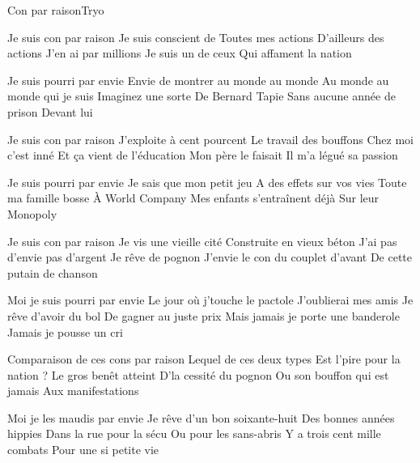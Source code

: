 \begin{Song}{Con par raison}{Tryo}
\begin{multicols}{2}
\begin{Verse}
Je suis con par raison
Je suis conscient de
Toutes mes actions
D'ailleurs des actions
J'en ai par millions
Je suis un de ceux
Qui affament la nation
\end{Verse}
\espaceInterStrophe

\begin{Chorus}
Je suis pourri par envie
Envie de montrer au monde au monde
Au monde au monde qui je suis
Imaginez une sorte
De Bernard Tapie
Sans aucune année de prison
Devant lui
\end{Chorus}
\espaceInterStrophe

\begin{Verse}
Je suis con par raison
J'exploite à cent pourcent
Le travail des bouffons
Chez moi c'est inné
Et ça vient de l'éducation
Mon père le faisait
Il m'a légué sa passion
\end{Verse}
\espaceInterStrophe

\begin{Chorus}
Je suis pourri par envie
Je sais que mon petit jeu
A des effets sur vos vies
Toute ma famille bosse
\`A World Company
Mes enfants s'entraînent déjà
Sur leur Monopoly
\end{Chorus}
\vfill
\columnbreak

\begin{Verse}
Je suis con par raison
Je vis une vieille cité
Construite en vieux béton
J'ai pas d'envie pas d'argent
Je rêve de pognon
J'envie le con du couplet d'avant
De cette putain de chanson
\end{Verse}
\espaceInterStrophe

\begin{Chorus}
Moi je suis pourri par envie
Le jour où j'touche le pactole
J'oublierai mes amis
Je rêve d'avoir du bol
De gagner au juste prix
Mais jamais je porte une banderole
Jamais je pousse un cri
\end{Chorus}
\espaceInterStrophe

\begin{Bridge}
Comparaison de ces cons par raison
Lequel de ces deux types
Est l'pire pour la nation ?
Le gros benêt atteint
D'la cessité du pognon
Ou son bouffon qui est jamais
Aux manifestations
\end{Bridge}
\espaceInterStrophe

\begin{Chorus}
Moi je les maudis par envie
Je rêve d'un bon soixante-huit
Des bonnes années hippies
Dans la rue pour la sécu
Ou pour les sans-abris
Y a trois cent mille combats
Pour une si petite vie
\end{Chorus}
\end{multicols}


\end{Song}
